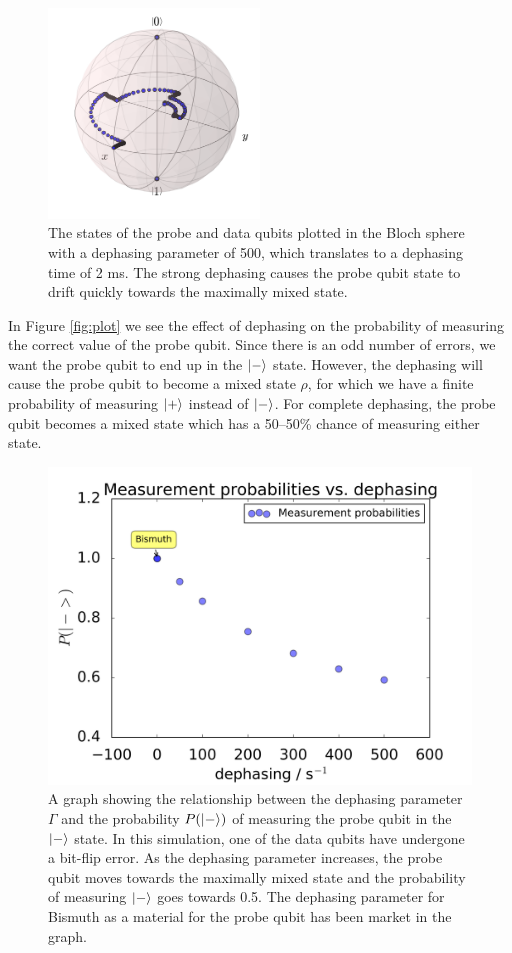 \begin{figure}[!h]
  \centering
    \includegraphics[width=0.5\textwidth]{Figures/Circ_orbit_odd_500_dephasing.png}
      \caption{The states of the probe and data qubits plotted in the Bloch sphere with a dephasing parameter of 500, which translates to a dephasing time of 2 ms. The strong dephasing causes the probe qubit state to drift quickly towards the maximally mixed state. }
\end{figure}

In Figure \ref{fig:plot} we see the effect of dephasing on the probability of measuring the correct value of the probe qubit. Since there is an odd number of errors, we want the probe qubit to end up in the $\ket{-}$ state. However, the dephasing will cause the probe qubit to become a mixed state $\rho$, for which we have a finite probability of measuring $\ket{+} $ instead of $\ket{-}$. For complete dephasing, the probe qubit becomes a mixed state which has a 50--50\% chance of measuring either state. 

\begin{figure}[!ht]
	\centering
	\includegraphics[width=\textwidth]{Figures/phase_graph.png}
		\caption{A graph showing the relationship between the dephasing parameter $\Gamma$ and the probability $P(\ket{-})$ of measuring the probe qubit in the $\ket{-}$ state. In this simulation, one of the data qubits have undergone a bit-flip error. As the dephasing parameter increases, the probe qubit moves towards the maximally mixed state and the probability of measuring $\ket{-}$ goes towards 0.5. The dephasing parameter for Bismuth as a material for the probe qubit has been market in the graph.}
\end{figure}

